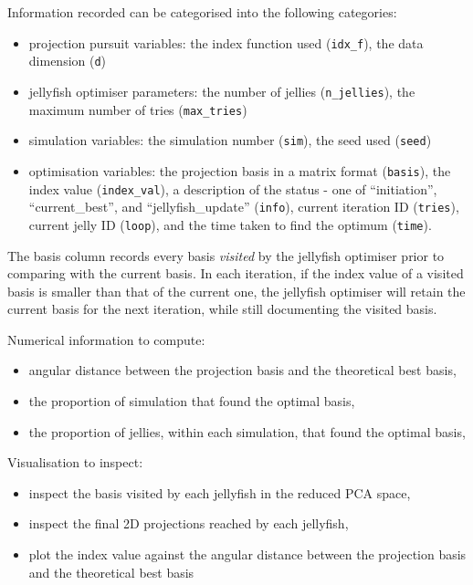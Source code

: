 \documentclass[
  number,
  preprint,
  3p]{elsarticle}
\providecommand{\tightlist}{%
  \setlength{\itemsep}{0pt}\setlength{\parskip}{0pt}}\usepackage{longtable,booktabs,array}
\begin{document}
Information recorded can be categorised into the following categories:

\begin{itemize}
\tightlist
\item
  projection pursuit variables: the index function used
  (\texttt{idx\_f}), the data dimension (\texttt{d})
\item
  jellyfish optimiser parameters: the number of jellies
  (\texttt{n\_jellies}), the maximum number of tries
  (\texttt{max\_tries})
\item
  simulation variables: the simulation number (\texttt{sim}), the seed
  used (\texttt{seed})
\item
  optimisation variables: the projection basis in a matrix format
  (\texttt{basis}), the index value (\texttt{index\_val}), a description
  of the status - one of ``initiation'', ``current\_best'', and
  ``jellyfish\_update'' (\texttt{info}), current iteration ID
  (\texttt{tries}), current jelly ID (\texttt{loop}), and the time taken
  to find the optimum (\texttt{time}).
\end{itemize}

The basis column records every basis \emph{visited} by the jellyfish
optimiser prior to comparing with the current basis. In each iteration,
if the index value of a visited basis is smaller than that of the
current one, the jellyfish optimiser will retain the current basis for
the next iteration, while still documenting the visited basis.

Numerical information to compute:

\begin{itemize}
\tightlist
\item
  angular distance between the projection basis and the theoretical best
  basis,
\item
  the proportion of simulation that found the optimal basis,
\item
  the proportion of jellies, within each simulation, that found the
  optimal basis,
\end{itemize}

Visualisation to inspect:

\begin{itemize}
\tightlist
\item
  inspect the basis visited by each jellyfish in the reduced PCA space,
\item
  inspect the final 2D projections reached by each jellyfish,
\item
  plot the index value against the angular distance between the
  projection basis and the theoretical best basis
\end{itemize}
\end{document}
